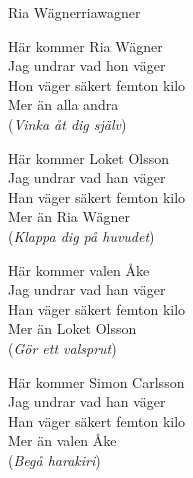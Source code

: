 \begin{song}{Ria Wägner}{riawagner}
\begin{vers}
Här kommer Ria Wägner\\
Jag undrar vad hon väger\\
Hon väger säkert femton kilo\\
Mer än alla andra\\
(\textit{Vinka åt dig själv})\\
\end{vers}
\begin{vers}
Här kommer Loket Olsson\\
Jag undrar vad han väger\\
Han väger säkert femton kilo\\
Mer än Ria Wägner\\
(\textit{Klappa dig på huvudet})\\
\end{vers}
\begin{vers}
Här kommer valen Åke\\
Jag undrar vad han väger\\
Han väger säkert femton kilo\\
Mer än Loket Olsson\\
(\textit{Gör ett valsprut})\\
\end{vers}
\begin{vers}
Här kommer Simon Carlsson\\
Jag undrar vad han väger\\
Han väger säkert femton kilo\\
Mer än valen Åke\\
(\textit{Begå harakiri})
\end{vers}
\end{song}
